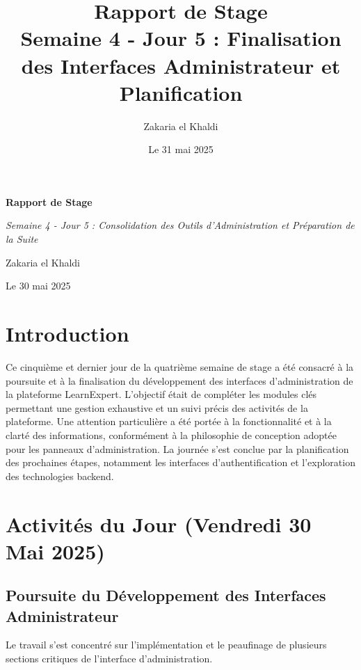 \documentclass[12pt, a4paper]{article}
\title{\Huge\bfseries\color{primary} Rapport de Stage \\ 
      \Large Semaine 4 - Jour 5 : Finalisation des Interfaces Administrateur et Planification} %
\author{\Large Zakaria el Khaldi}
\date{\large Le 31 mai 2025} %
\begin{document}
\begin{titlepage}
  \centering
  {\Huge\bfseries\color{primary} Rapport de Stage \par}
  \vspace{1cm}
  {\Large\itshape Semaine 4 - Jour 5 : Consolidation des Outils d'Administration et Préparation de la Suite\par} %
  \vspace{2cm}
  
  \vspace{2cm}
  {\Large Zakaria el Khaldi\par}
  \vfill
  {\large Le 30 mai 2025\par} %
\end{titlepage}

\tableofcontents
\thispagestyle{empty}
\newpage

\section{Introduction}
\thispagestyle{fancy}
Ce cinquième et dernier jour de la quatrième semaine de stage a été consacré à la poursuite et à la finalisation du développement des interfaces d'administration de la plateforme LearnExpert. L'objectif était de compléter les modules clés permettant une gestion exhaustive et un suivi précis des activités de la plateforme. Une attention particulière a été portée à la fonctionnalité et à la clarté des informations, conformément à la philosophie de conception adoptée pour les panneaux d'administration. La journée s'est conclue par la planification des prochaines étapes, notamment les interfaces d'authentification et l'exploration des technologies backend.

\section{Activités du Jour (Vendredi 30 Mai 2025)} %

\subsection{Poursuite du Développement des Interfaces Administrateur}
Le travail s'est concentré sur l'implémentation et le peaufinage de plusieurs sections critiques de l'interface d'administration.
\end{document}
